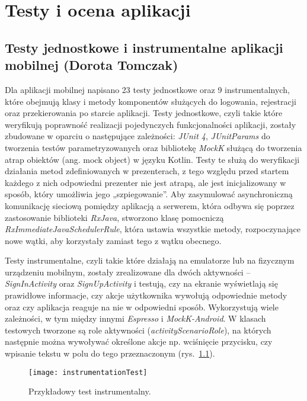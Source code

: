 \chapter{Testy i ocena aplikacji}

\section{Testy jednostkowe i instrumentalne aplikacji mobilnej (Dorota Tomczak)}
\par Dla aplikacji mobilnej napisano 23 testy jednostkowe oraz 9 instrumentalnych, które obejmują klasy i metody komponentów służących do logowania, rejestracji oraz przekierowania po starcie aplikacji. Testy jednostkowe, czyli takie które weryfikują poprawność realizacji pojedynczych funkcjonalności aplikacji, zostały zbudowane w oparciu o następujące zależności: \textit{JUnit 4}\cite{JUnit}, \textit{JUnitParams}\cite{JUnitParams} do tworzenia testów parametryzowanych oraz bibliotekę \textit{MockK}\cite{MockK} służącą do tworzenia atrap obiektów (ang. mock object) w języku Kotlin. Testy te służą do weryfikacji działania metod zdefiniowanych w prezenterach, z tego względu przed startem każdego z nich odpowiedni prezenter nie jest atrapą, ale jest inicjalizowany w sposób, który umożliwia jego „szpiegowanie”. Aby zasymulować asynchroniczną komunikację sieciową pomiędzy aplikacją a serwerem, która odbywa się poprzez zastosowanie biblioteki \textit{RxJava}\cite{RxJava}, stworzono klasę pomocniczą \textit{RxImmediateJavaSchedulerRule}, która ustawia wszystkie metody, rozpoczynające nowe wątki, aby korzystały zamiast tego z wątku obecnego.
\par Testy instrumentalne, czyli takie które działają na emulatorze lub na fizycznym urządzeniu mobilnym, zostały zrealizowane dla dwóch aktywności – \textit{SignInActivity} oraz \textit{SignUpActivity} i testują, czy na ekranie wyświetlają się prawidłowe informacje, czy akcje użytkownika wywołują odpowiednie metody oraz czy aplikacja reaguje na nie w odpowiedni sposób. Wykorzystują wiele zależności, w tym między innymi \textit{Espresso}\cite{Espresso} i \textit{MockK-Android}\cite{MockK-Android}. W klasach testowych tworzone są role aktywności (\textit{activityScenarioRole}), na których następnie można wywoływać określone akcje np. wciśnięcie przycisku, czy wpisanie tekstu w polu do tego przeznaczonym (rys.~\ref{fig:instrumentationTest}).

\begin{figure}[h]
\centering
\texttt{[image: instrumentationTest]}
\caption{Przykładowy test instrumentalny.}
\label{fig:instrumentationTest}
\end{figure}

